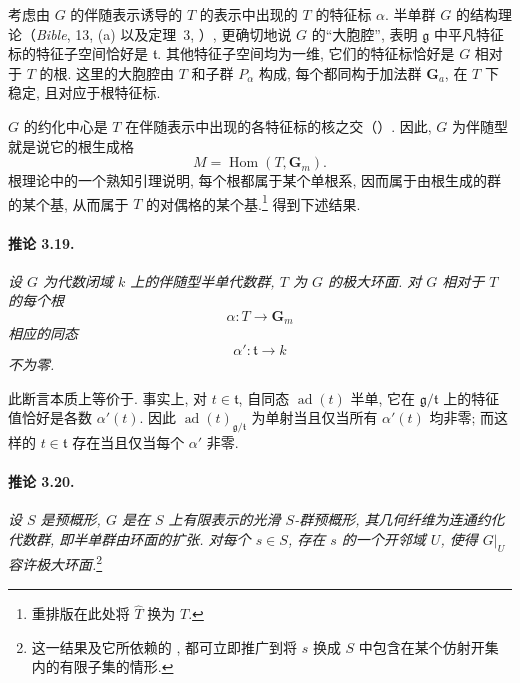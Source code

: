 考虑由 \(G\) 的伴随表示诱导的 \(T\) 的表示中出现的 \(T\) 的特征标 \(\alpha\). 半单群 \(G\) 的结构理论\textup{（\emph{Bible}, 13, \textup{(a)} 以及定理~3, ）}, 更确切地说 \(G\) 的“大胞腔”, 表明 \(\mathfrak g\) 中平凡特征标的特征子空间恰好是 \(\mathfrak t\). 其他特征子空间均为一维, 它们的特征标恰好是 \(G\) 相对于 \(T\) 的根. 这里的大胞腔由 \(T\) 和子群 \(P_\alpha\) 构成, 每个都同构于加法群 \(\mathbf G_a\), 在 \(T\) 下稳定, 且对应于根特征标.

\(G\) 的约化中心是 \(T\) 在伴随表示中出现的各特征标的核之交\textup{（）}. 因此, \(G\) 为伴随型就是说它的根生成格
\[
  M=\operatorname{Hom}(T,\mathbf G_m).
\]
根理论中的一个熟知引理说明, 每个根都属于某个单根系, 因而属于由根生成的群的某个基, 从而属于 \(T\) 的对偶格的某个基.\footnote{重排版在此处将 \(\widehat T\) 换为 \(T\).} 得到下述结果.

\paragraph{\textbf{推论 3.19.}}
{\itshape 设 \(G\) 为代数闭域 \(k\) 上的伴随型半单代数群, \(T\) 为 \(G\) 的极大环面. 对 \(G\) 相对于 \(T\) 的每个根
\[
  \alpha\colon T\longrightarrow\mathbf G_m
\]
相应的同态
\[
  \alpha'\colon\mathfrak t\longrightarrow k
\]
不为零.}

此断言本质上等价于. 事实上, 对 \(t\in\mathfrak t\), 自同态 \(\operatorname{ad}(t)\) 半单, 它在 \(\mathfrak g/\mathfrak t\) 上的特征值恰好是各数 \(\alpha'(t)\). 因此 \(\operatorname{ad}(t)_{\mathfrak g/\mathfrak t}\) 为单射当且仅当所有 \(\alpha'(t)\) 均非零; 而这样的 \(t\in\mathfrak t\) 存在当且仅当每个 \(\alpha'\) 非零.



\paragraph{\textbf{推论 3.20.}}
{\itshape 设 \(S\) 是预概形, \(G\) 是在 \(S\) 上有限表示的光滑 \(S\)-群预概形, 其几何纤维为连通约化代数群, 即半单群由环面的扩张. 对每个 \(s\in S\), 存在 \(s\) 的一个开邻域 \(U\), 使得 \(G|_U\) 容许极大环面.}\footnote{这一结果及它所依赖的 , 都可立即推广到将 \(s\) 换成 \(S\) 中包含在某个仿射开集内的有限子集的情形.}

